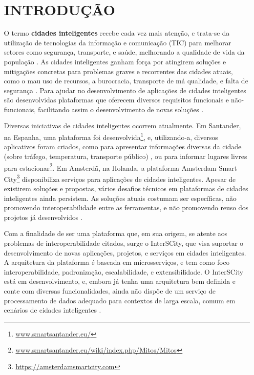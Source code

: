 \chapter[INTRODUÇÃO]{INTRODUÇÃO}
\label{chapter:intro}

O termo \textbf{cidades inteligentes} recebe cada vez mais atenção, e trata-se
da utilização de tecnologias da informação e comunicação (TIC) para melhorar
setores como segurança, transporte, e saúde, melhorando a qualidade de vida
da população \cite{batty2012smart}. As cidades inteligentes ganham força por
atingirem soluções e mitigações concretas para problemas graves e recorrentes
das cidades atuais, como o mau uso de recursos, a burocracia, transporte de má
qualidade, e falta de segurança \cite{batty2012smart}. Para ajudar no
desenvolvimento de aplicações de cidades inteligentes são desenvolvidas
plataformas que oferecem diversos requisitos funcionais e não-funcionais,
facilitando assim o desenvolvimento de novas soluções \cite{kon2016}.

Diversas iniciativas de cidades inteligentes ocorrem atualmente. Em Santander,
na Espanha, uma plataforma foi
desenvolvida\footnote{\url{www.smartsantander.eu/}}, e, utilizando-a,
diversos aplicativos foram criados, como para apresentar informações diversas
da cidade (sobre tráfego, temperatura, transporte público)
\cite{gutierrez2013}, ou para informar lugares livres para
estacionar\footnote{\url{www.smartsantander.eu/wiki/index.php/Mitos/Mitos}}.
Em Amsterdã, na Holanda, a plataforma Amsterdam Smart
City\footnote{\url{https://amsterdamsmartcity.com}} disponibiliza serviços para
aplicações de cidades inteligentes. Apesar de existirem soluções
e propostas, vários desafios técnicos em plataformas de cidades inteligentes
ainda persistem. As soluções atuais costumam ser específicas, não promovendo
interoperabilidade entre as ferramentas, e não promovendo reuso dos projetos já
desenvolvidos \cite{delesposte2017}.

Com a finalidade de ser uma plataforma que, em sua origem, se atente aos
problemas de interoperabilidade citados, surge o InterSCity, que visa
suportar o desenvolvimento de novas aplicações, projetos, e serviços em cidades
inteligentes. A arquitetura da plataforma é baseada em microsserviços, e
tem como foco interoperabilidade, padronização, escalabilidade, e
extensibilidade. O InterSCity está em desenvolvimento, e, embora já tenha uma
arquitetura bem definida e conte com diversas funcionalidades, ainda não dispõe
de um serviço de processamento de dados adequado para contextos de larga
escala, comum em cenários de cidades inteligentes \cite{alnuaimi2015}.

